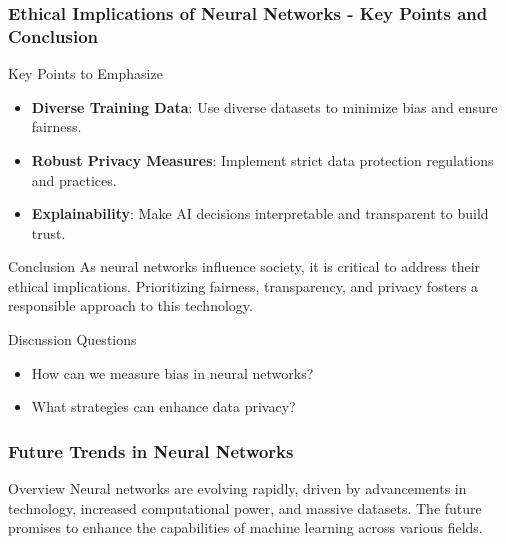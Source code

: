 \documentclass[aspectratio=169]{beamer}
\begin{document}
\begin{frame}[fragile]
    \frametitle{Ethical Implications of Neural Networks - Key Points and Conclusion}
    \begin{block}{Key Points to Emphasize}
        \begin{itemize}
            \item \textbf{Diverse Training Data}: Use diverse datasets to minimize bias and ensure fairness.
            \item \textbf{Robust Privacy Measures}: Implement strict data protection regulations and practices.
            \item \textbf{Explainability}: Make AI decisions interpretable and transparent to build trust.
        \end{itemize}
    \end{block}

    \begin{block}{Conclusion}
        As neural networks influence society, it is critical to address their ethical implications. Prioritizing fairness, transparency, and privacy fosters a responsible approach to this technology.
    \end{block}

    \begin{block}{Discussion Questions}
        \begin{itemize}
            \item How can we measure bias in neural networks?
            \item What strategies can enhance data privacy?
        \end{itemize}
    \end{block}
\end{frame}

\begin{frame}[fragile]
    \frametitle{Future Trends in Neural Networks}
    \begin{block}{Overview}
        Neural networks are evolving rapidly, driven by advancements in technology, increased computational power, and massive datasets. The future promises to enhance the capabilities of machine learning across various fields.
    \end{block}
\end{frame}
\end{document}
